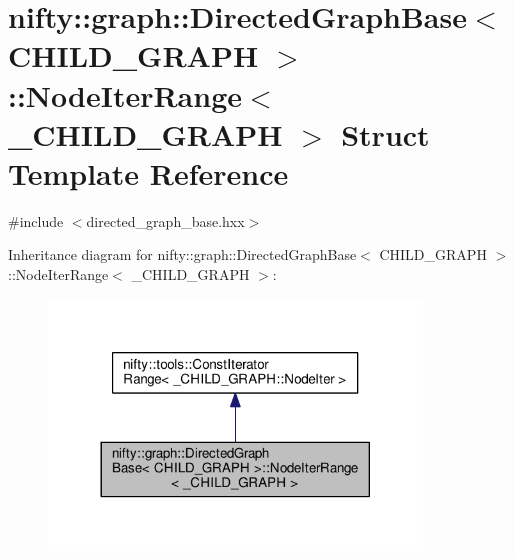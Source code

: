 \hypertarget{structnifty_1_1graph_1_1DirectedGraphBase_1_1NodeIterRange}{}\section{nifty\+:\+:graph\+:\+:Directed\+Graph\+Base$<$ C\+H\+I\+L\+D\+\_\+\+G\+R\+A\+P\+H $>$\+:\+:Node\+Iter\+Range$<$ \+\_\+\+C\+H\+I\+L\+D\+\_\+\+G\+R\+A\+P\+H $>$ Struct Template Reference}
\label{structnifty_1_1graph_1_1DirectedGraphBase_1_1NodeIterRange}


{\ttfamily \#include $<$directed\+\_\+graph\+\_\+base.\+hxx$>$}



Inheritance diagram for nifty\+:\+:graph\+:\+:Directed\+Graph\+Base$<$ C\+H\+I\+L\+D\+\_\+\+G\+R\+A\+P\+H $>$\+:\+:Node\+Iter\+Range$<$ \+\_\+\+C\+H\+I\+L\+D\+\_\+\+G\+R\+A\+P\+H $>$\+:\nopagebreak
\begin{figure}[H]
\begin{center}
\leavevmode
\includegraphics[width=281pt]{structnifty_1_1graph_1_1DirectedGraphBase_1_1NodeIterRange__inherit__graph}
\end{center}
\end{figure}


